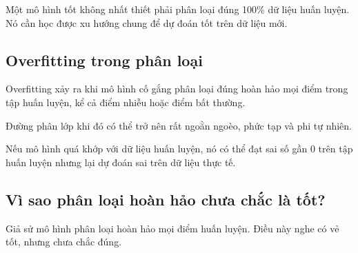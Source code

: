 \begin{ghinho}
Một mô hình tốt không nhất thiết phải phân loại đúng 100\% dữ liệu huấn luyện. Nó cần học được xu hướng chung để dự đoán tốt trên dữ liệu mới.
\end{ghinho}

\subsection{Overfitting trong phân loại}

Overfitting xảy ra khi mô hình cố gắng phân loại đúng hoàn hảo mọi điểm trong tập huấn luyện, kể cả điểm nhiễu hoặc điểm bất thường.

Đường phân lớp khi đó có thể trở nên rất ngoằn ngoèo, phức tạp và phi tự nhiên.

\begin{center}
\end{center}

\begin{canhbao}
Nếu mô hình quá khớp với dữ liệu huấn luyện, nó có thể đạt sai số gần 0 trên tập huấn luyện nhưng lại dự đoán sai trên dữ liệu thực tế.
\end{canhbao}

\subsection{Vì sao phân loại hoàn hảo chưa chắc là tốt?}

Giả sử mô hình phân loại hoàn hảo mọi điểm huấn luyện. Điều này nghe có vẻ tốt, nhưng chưa chắc đúng.

